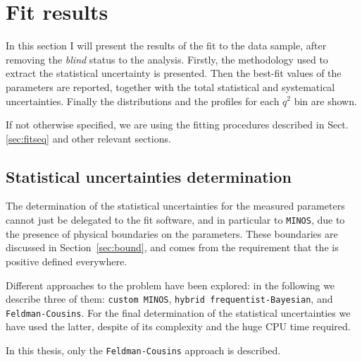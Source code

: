 \chapter{Fit results}
\label{sec:result}

In this section I will present the results of the fit to the data sample, after removing the \textit{blind} status to the analysis.
Firstly, the methodology used to extract the statistical uncertainty is presented.
Then the best-fit values of the parameters are reported, together with the total statistical and systematical uncertainties.
Finally the distributions and the \pdf profiles for each $q^2$ bin are shown.


If not otherwise specified, we are using the fitting procedures described in Sect.\ref{sec:fitseq} and other relevant sections.

\section{Statistical uncertainties determination}\label{sec:statUncert}

The determination of the statistical uncertainties for the measured parameters cannot just be delegated to the fit software, and in particular to {\tt MINOS}, due to the presence of physical boundaries on the parameters.
These boundaries are discussed in Section~\ref{sec:bound}, and comes from the requirement that the \pdf is positive defined everywhere.

Different approaches to the problem have been explored: in the following we describe three of them: {\tt custom MINOS}, {\tt hybrid frequentist-Bayesian}, and {\tt Feldman-Cousins}.
For the final determination of the statistical uncertainties we have used the latter, despite of its complexity and the huge CPU time required.

In this thesis, only the {\tt Feldman-Cousins} approach is described.

